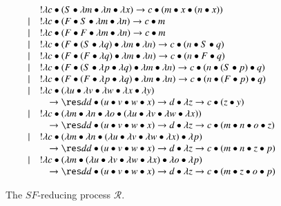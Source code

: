 \documentclass{llncs}
\begin{document}
\begin{figure}[t]
\begin{equation*}
\begin{array}{cl}
& !\lambda c\bullet(S\bullet \lambda m\bullet \lambda n\bullet \lambda x) \to c\bullet(m\bullet x\bullet (n\bullet x))\\
|&!\lambda c\bullet(F\bullet S\bullet \lambda m\bullet \lambda n) \to c\bullet m\\
|&!\lambda c\bullet(F\bullet F\bullet \lambda m\bullet \lambda n) \to c\bullet m\\
|&!\lambda c\bullet(F\bullet (S\bullet \lambda q)\bullet \lambda m\bullet \lambda n) \to c\bullet(n\bullet S\bullet q)\\
|&!\lambda c\bullet(F\bullet (F\bullet \lambda q)\bullet \lambda m\bullet \lambda n) \to c\bullet(n\bullet F\bullet q)\\
|&!\lambda c\bullet(F\bullet (S\bullet\lambda p\bullet \lambda q)\bullet \lambda m\bullet \lambda n)
		\to c\bullet(n\bullet (S\bullet p)\bullet q)\\
|&!\lambda c\bullet(F\bullet (F\bullet\lambda p\bullet \lambda q)\bullet \lambda m\bullet \lambda n)
		\to c\bullet(n\bullet (F\bullet p)\bullet q)\\
|&!\lambda c\bullet(\lambda u\bullet \lambda v\bullet\lambda w\bullet \lambda x\bullet\lambda y)\\
&\quad\to\res d d\bullet (u\bullet v\bullet w\bullet x)\to d\bullet \lambda z
		\to c\bullet(z\bullet y)\\
|&!\lambda c\bullet(\lambda m\bullet \lambda n \bullet \lambda o\bullet (\lambda u\bullet \lambda v\bullet \lambda w\bullet \lambda x))\\
&\quad\to\res d d\bullet(u\bullet v\bullet w\bullet x)\to d\bullet\lambda z
			\to c\bullet (m \bullet n\bullet o\bullet z)\\
|&!\lambda c\bullet(\lambda m\bullet \lambda n \bullet (\lambda u\bullet \lambda v\bullet \lambda w\bullet \lambda x)\bullet \lambda p)\\
&\quad\to\res d d\bullet(u\bullet v\bullet w\bullet x)\to d\bullet\lambda z
			\to c\bullet (m \bullet n\bullet z\bullet p)\\	
|&!\lambda c\bullet(\lambda m\bullet (\lambda u\bullet \lambda v\bullet \lambda w\bullet \lambda x) \bullet \lambda o\bullet \lambda p)\\
&\quad\to\res d d\bullet(u\bullet v\bullet w\bullet x)\to d\bullet\lambda z
			\to c\bullet (m \bullet z\bullet o\bullet p)
\end{array}
\end{equation*}
\caption{The $SF$-reducing process ${\mathcal R}$.}
\label{fig:SF-red-paper}
\end{figure}
\end{document}
